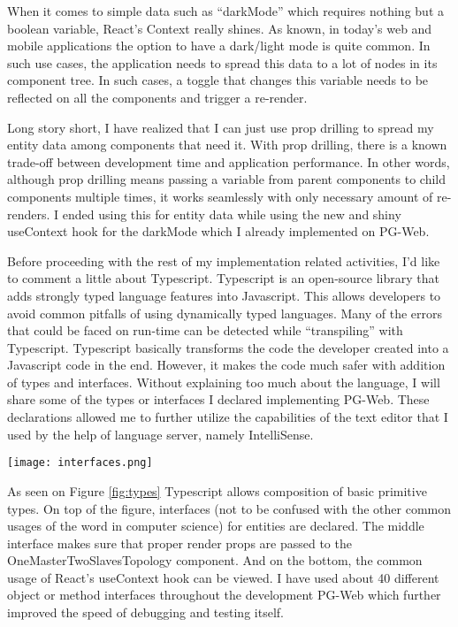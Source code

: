 When it comes to simple data such as ``darkMode'' which requires nothing but 
a boolean variable, React's Context really shines. As known, in today's web 
and mobile applications the option to have a dark/light mode is quite common. 
In such use cases, the application needs to spread this data to a lot of nodes 
in its component tree. In such cases, a toggle that changes this variable 
needs to be reflected on all the components and trigger a re-render.
\par
Long story short, I have realized that I can just use prop drilling to spread 
my entity data among components that need it. With prop drilling, there is a 
known trade-off between development time and application performance. In other 
words, although prop drilling means passing a variable from parent components 
to child components multiple times, it works seamlessly with only necessary 
amount of re-renders. I ended using this for entity data while using the new 
and shiny useContext hook for the darkMode which I already implemented on 
PG-Web.
\par
Before proceeding with the rest of my implementation related activities, I'd 
like to comment a little about Typescript. Typescript is an open-source 
library that adds strongly typed language features into Javascript. This 
allows developers to avoid common pitfalls of using dynamically typed 
languages. Many of the errors that could be faced on run-time can be detected 
while ``transpiling'' with Typescript. Typescript basically transforms the 
code the developer created into a Javascript code in the end. However, it 
makes the code much safer with addition of types and interfaces. Without 
explaining too much about the language, I will share some of the types or 
interfaces I declared implementing PG-Web. These declarations allowed me to 
further utilize the capabilities of the text editor that I used by the help 
of language server, namely IntelliSense.

\begin{figure*}[b!]
    \centering
    \texttt{[image: interfaces.png]}
    \caption{Various interfaces that force type checking.}
    \label{fig:types}
\end{figure*}
\pagebreak
As seen on Figure \ref{fig:types} Typescript allows composition of basic 
primitive types. On top of the figure, interfaces (not to be confused with the 
other common usages of the word in computer science) for entities are declared.
The middle interface makes sure that proper render props are passed to the 
OneMasterTwoSlavesTopology component. And on the bottom, the common usage of 
React's useContext hook can be viewed. I have used about 40 different object 
or method interfaces throughout the development PG-Web which further improved 
the speed of debugging and testing itself.
\par
